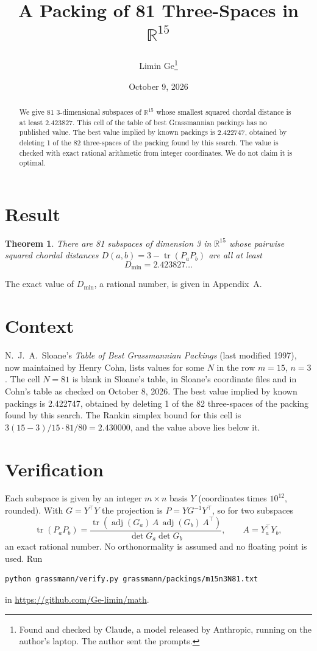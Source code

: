 \documentclass[11pt,a4paper]{article}
\title{A Packing of 81 Three-Spaces in $\mathbb{R}^{15}$}
\author{Limin Ge\thanks{Found and checked by Claude, a model released by Anthropic, running on the author's laptop. The author sent the prompts.}}
\date{October 9, 2026}
\newtheorem*{theorem}{Theorem}
\begin{document}
\maketitle
\begin{abstract}
We give 81 3-dimensional subspaces of $\mathbb{R}^{15}$ whose smallest squared chordal distance is at least 2.423827. This cell of the table of best Grassmannian packings has no published value. The best value implied by known packings is 2.422747, obtained by deleting 1 of the 82 three-spaces of the packing found by this search. The value is checked with exact rational arithmetic from integer coordinates. We do not claim it is optimal.
\end{abstract}

\section{Result}
\begin{theorem}
There are 81 subspaces of dimension 3 in $\mathbb{R}^{15}$ whose pairwise squared chordal distances $D(a,b) = 3 - \operatorname{tr}(P_aP_b)$ are all at least
\[ D_{\min} = 2.423827\ldots \]
\end{theorem}
The exact value of $D_{\min}$, a rational number, is given in Appendix~A.


\section{Context}
N.~J.~A.~Sloane's \emph{Table of Best Grassmannian Packings} (last modified 1997), now maintained by Henry Cohn, lists values for some $N$ in the row $m=15$, $n=3$. The cell $N=81$ is blank in Sloane's table, in Sloane's coordinate files and in Cohn's table as checked on October 8, 2026. The best value implied by known packings is 2.422747, obtained by deleting 1 of the 82 three-spaces of the packing found by this search. The Rankin simplex bound for this cell is $3(15-3)/15\cdot 81/80 = 2.430000$, and the value above lies below it.


\section{Verification}
Each subspace is given by an integer $m\times n$ basis $Y$ (coordinates times $10^{12}$, rounded). With $G=Y^\top Y$ the projection is $P=YG^{-1}Y^\top$, so for two subspaces
\[ \operatorname{tr}(P_aP_b)=\frac{\operatorname{tr}(\operatorname{adj}(G_a)\,A\,\operatorname{adj}(G_b)\,A^\top)}{\det G_a\det G_b},\qquad A=Y_a^\top Y_b, \]
an exact rational number. No orthonormality is assumed and no floating point is used. Run
\begin{verbatim}
python grassmann/verify.py grassmann/packings/m15n3N81.txt
\end{verbatim}
in \url{https://github.com/Ge-limin/math}.
\end{document}
